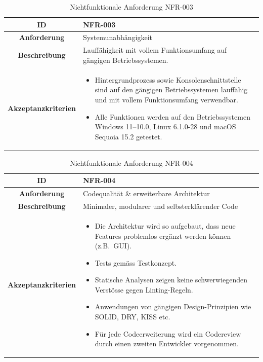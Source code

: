\documentclass[a4paper,12pt]{report}
\begin{document}
    \begin{table}[h!]
        \centering
        \setlength{\leftmargini}{0.4cm}
        \begin{tabular}{|c|p{10cm}|}
            \hline
            \textbf{ID}           & NFR-003                                                                 \\ \hline
            \textbf{Anforderung}  & Systemunabhängigkeit                                                    \\ \hline
            \textbf{Beschreibung} & Lauffähigkeit mit vollem Funktionsumfang auf gängigen Betriebssystemen. \\ \hline
            \textbf{Akzeptanzkriterien} &
            \begin{itemize}
                \item Hintergrundprozess sowie Konsolenschnittstelle sind auf den gängigen Betriebssystemen lauffähig und mit vollem Funktionsumfang verwendbar.
                \item Alle Funktionen werden auf den Betriebssystemen Windows 11--10.0, Linux 6.1.0-28 und macOS Sequoia 15.2 getestet.
            \end{itemize}
            \\ \hline
        \end{tabular}
        \caption{Nichtfunktionale Anforderung NFR-003}\label{tab:table5}
    \end{table}
    \clearpage
    \begin{table}[h!]
        \centering
        \setlength{\leftmargini}{0.4cm}
        \begin{tabular}{|c|p{10cm}|}
            \hline
            \textbf{ID}           & NFR-004                                         \\ \hline
            \textbf{Anforderung}  & Codequalität \& erweiterbare Architektur        \\ \hline
            \textbf{Beschreibung} & Minimaler, modularer und selbsterklärender Code \\ \hline
            \textbf{Akzeptanzkriterien} &
            \begin{itemize}
                \item Die Architektur wird so aufgebaut, dass neue Features problemlos ergänzt werden können (z.B.\ GUI).
                \item Tests gemäss Testkonzept.
                \item Statische Analysen zeigen keine schwerwiegenden Verstösse gegen Linting-Regeln.
                \item Anwendungen von gängigen Design-Prinzipien wie SOLID, DRY, KISS etc.
                \item Für jede Codeerweiterung wird ein Codereview durch einen zweiten Entwickler vorgenommen.
            \end{itemize}
            \\ \hline
        \end{tabular}
        \caption{Nichtfunktionale Anforderung NFR-004}\label{tab:table6}
    \end{table}
\end{document}
